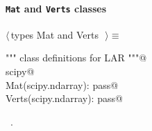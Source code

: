 \documentclass[11pt,oneside]{article}	%
\begin{document}
\paragraph{\texttt{Mat} and \texttt{Verts} classes}
\begin{flushleft} \small \label{scrap22}
$\langle\,$types Mat and Verts\nobreak\ {\footnotesize {}}$\,\rangle\equiv$
\vspace{-1ex}
\begin{list}{}{} \item
\mbox{}\verb@""" class definitions for LAR """@\\
\mbox{}\verb@import scipy@\\
\mbox{}\verb@class Mat(scipy.ndarray): pass@\\
\mbox{}\verb@class Verts(scipy.ndarray): pass@\\
\mbox{}\verb@@{\NWsep}
\end{list}
\vspace{-1ex}
\footnotesize\addtolength{\baselineskip}{-1ex}
\begin{list}{}{\setlength{\itemsep}{-\parsep}\setlength{\itemindent}{-\leftmargin}}
\item \NWtxtMacroRefIn\ .
\end{list}
\end{flushleft}
\end{document}
